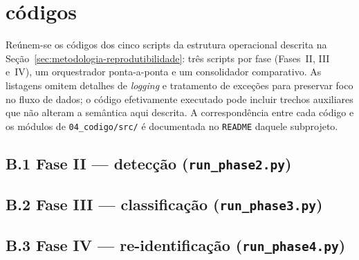 
\chapter{códigos}
\label{ap:pseudocodigos}

Reúnem-se os códigos dos cinco scripts da estrutura operacional descrita na Seção~\ref{sec:metodologia-reprodutibilidade}: três scripts por fase (Fases~II, III e~IV), um orquestrador ponta-a-ponta e um consolidador comparativo. As listagens omitem detalhes de \emph{logging} e tratamento de exceções para preservar foco no fluxo de dados; o código efetivamente executado pode incluir trechos auxiliares que não alteram a semântica aqui descrita. A correspondência entre cada código e os módulos de \texttt{04\_codigo/src/} é documentada no \texttt{README} daquele subprojeto.

\section*{B.1 Fase II --- detecção (\texttt{run\_phase2.py})}



\clearpage
\section*{B.2 Fase III --- classificação (\texttt{run\_phase3.py})}



\clearpage
\section*{B.3 Fase IV --- re-identificação (\texttt{run\_phase4.py})}

